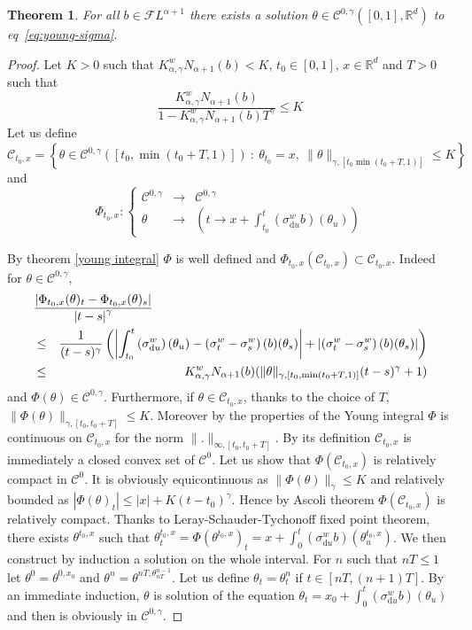 \documentclass[11pt,a4paper,draft,reqno]{amsart}
\newtheorem{theorem}{Theorem}
\theoremstyle{definition}
\newcommand{\RR}{\mathbb{R}}
\newcommand{\cF}{\mathcal{F}}
\newcommand{\dd}{\mathrm{d}}
\newcommand{\cC}{\mathcal{C}}
\begin{document}
\begin{theorem}
For all $b\in\cF L^{\alpha+1}$ there exists a solution $\theta\in \cC^{0,\gamma}([0,1],\RR^d)$ to eq~\eqref{eq:young-sigma}. 
\end{theorem}
\begin{proof}
 Let $K>0$ such that $K^w_{\alpha,\gamma}N_{\alpha+1}(b)<K$, $t_0\in[0,1]$, $x\in\RR^d$ and $T>0$ such that 
$$\frac{K^w_{\alpha,\gamma}N_{\alpha+1}(b)}{1-K^w_{\alpha,\gamma}N_{\alpha+1}(b)T^\gamma} \le K$$
Let us define 
$$\cC_{t_0,x} = \left\{\theta\in\cC^{0,\gamma}\left(\left[t_0,\min(t_0+T,1)\right]\right)\ : \ \theta_{t_0}=x,\ \|\theta\|_{\gamma,[t_0\min(t_0+T,1)]}\le K\right\}$$
and 
$$\Phi_{t_0,x} : \left\{
\begin{array}{rcl}
\cC^{0,\gamma} & \to & \cC^{0,\gamma}\\
\theta & \to & \left(t\to x + \int_{t_0}^t \left(\sigma^w_{\dd u}b\right)(\theta_u)\right)
\end{array}
\right.$$

By theorem \ref{young integral} $\Phi$ is well defined and $\Phi_{t_0,x}\left(\cC_{t_0,x}\right)\subset \cC_{t_0,x}$. Indeed for $\theta\in\cC^{0,\gamma}$,
\begin{eqnarray*}
\lefteqn{\frac{\left|\Phi_{t_0,x}(\theta)_t-\Phi_{t_0,x}(\theta)_s\right|}{\left|t-s\right|^{\gamma}}}\\
&\le&
\frac{1}{(t-s)^\gamma}\left(\left|\int_{t_0}^t\left(\sigma^w_{\dd u}\right)\left(\theta_u\right) - \left(\sigma^w_t-\sigma^w_s\right)(b)(\theta_s)\right| + \left|\left(\sigma^w_t-\sigma^w_s\right)(b)(\theta_s)\right|\right)\\
&\le&
K^w_{\alpha,\gamma}N_{\alpha+1}(b)(\|\theta\|_{\gamma,[t_0,\min(t_0+T,1)]}(t-s)^\gamma+1)\\
\end{eqnarray*}
and $\Phi(\theta)\in\cC^{0,\gamma}$. Furthermore, if $\theta\in\cC_{t_0,x}$, thanks to the choice of $T$, 
$\|\Phi(\theta)\|_{\gamma,[t_0,t_0+T]}\le K$. Moreover by the properties of the Young integral $\Phi$ is continuous on $\cC_{t_0,x}$ for the norm $\|.\|_{\infty,[t_0,t_0+T]}$. 
By its definition $\cC_{t_0,x}$ is immediately a closed convex set of $\cC^0$. Let us show that $\Phi(\cC_{t_0,x})$ is relatively compact in $\cC^0$. It is obviously equicontinuous as
$\|\Phi(\theta)\|_{\gamma}\le K$ and relatively bounded as $|\Phi(\theta)_t|\le |x| + K(t-t_0)^\gamma$. Hence by Ascoli theorem $\Phi(\cC_{t_0,x})$ is relatively compact. Thanks to Leray-Schauder-Tychonoff fixed point theorem, there exists $\theta^{t_0,x}$ such that 
$\theta^{t_0,x}_t=\Phi(\theta^{t_0,x})_t= x + \int_0^t\left(\sigma_{\dd u}^w b\right)(\theta^{t_0,x}_u)$.
We then construct by induction a solution on the whole interval. For $n$ such that $nT\le1$ let $\theta^0 = \theta^{0,x_0}$ and $\theta^n = \theta^{nT,\theta^{n-1}_{nT}}$. Let us define $\theta_t=\theta^n_t$ if $t\in[nT,(n+1)T]$. By an immediate induction, $\theta$ is solution of the equation
$\theta_t=x_0+\int_0^t\left(\sigma^w_{\dd u}b\right)(\theta_u)$
and then is obviously in $\cC^{0,\gamma}$. 
\end{proof}
\end{document}
